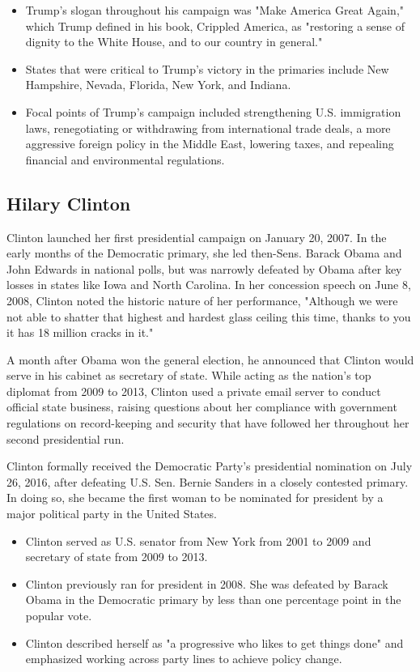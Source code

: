 	\begin{itemize}
		\item Trump's slogan throughout his campaign was "Make America Great Again," which Trump defined in his book, Crippled America, as "restoring a sense of dignity to the White House, and to our country in general."
		
		\item States that were critical to Trump's victory in the primaries include New Hampshire, Nevada, Florida, New York, and Indiana. 
		
		\item Focal points of Trump's campaign included strengthening U.S. immigration laws, renegotiating or withdrawing from international trade deals, a more aggressive foreign policy in the Middle East, lowering taxes, and repealing financial and environmental regulations.
	\end{itemize}


	\subsection{Hilary Clinton}
	Clinton launched her first presidential campaign on January 20, 2007. In the early months of the Democratic primary, she led then-Sens. Barack Obama and John Edwards in national polls, but was narrowly defeated by Obama after key losses in states like Iowa and North Carolina. In her concession speech on June 8, 2008, Clinton noted the historic nature of her performance, "Although we were not able to shatter that highest and hardest glass ceiling this time, thanks to you it has 18 million cracks in it."
	
	A month after Obama won the general election, he announced that Clinton would serve in his cabinet as secretary of state. While acting as the nation's top diplomat from 2009 to 2013, Clinton used a private email server to conduct official state business, raising questions about her compliance with government regulations on record-keeping and security that have followed her throughout her second presidential run.
	
	Clinton formally received the Democratic Party's presidential nomination on July 26, 2016, after defeating U.S. Sen. Bernie Sanders in a closely contested primary. In doing so, she became the first woman to be nominated for president by a major political party in the United States. 
	
	\begin{itemize}
		\item Clinton served as U.S. senator from New York from 2001 to 2009 and secretary of state from 2009 to 2013.
		
		\item Clinton previously ran for president in 2008. She was defeated by Barack Obama in the Democratic primary by less than one percentage point in the popular vote.
		
		\item Clinton described herself as "a progressive who likes to get things done" and emphasized working across party lines to achieve policy change.
	\end{itemize}
	

